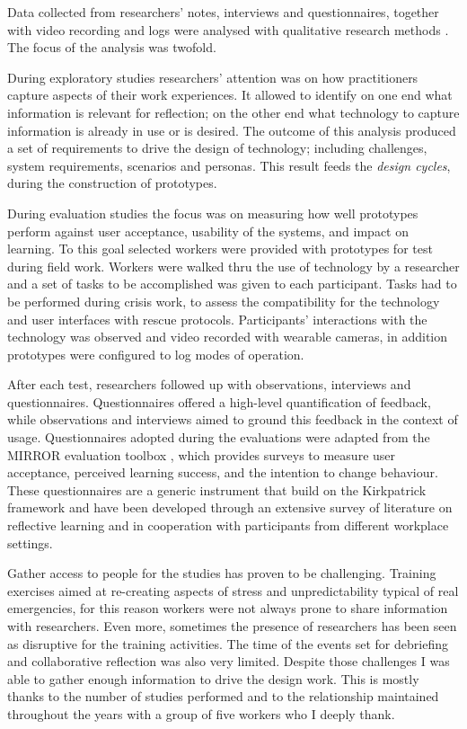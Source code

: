 Data collected from researchers' notes, interviews and questionnaires, together with video recording and logs were analysed with qualitative research methods \autocite{robson1993real}. The focus of the analysis was twofold.

During exploratory studies researchers' attention was on how practitioners capture aspects of their work experiences. It allowed to identify on one end what information is relevant for reflection; on the other end what technology to capture information is already in use or is desired. The outcome of this analysis produced a set of requirements to drive the design of technology; including challenges, system requirements, scenarios and personas. This result feeds the \emph{design cycles}, during the construction of prototypes.

During evaluation studies the focus was on measuring how well prototypes perform against user acceptance, usability of the systems, and impact on learning. To this goal selected workers were provided with prototypes for test during field work. Workers were walked thru the use of technology by a researcher and a set of tasks to be accomplished was given to each participant. Tasks had to be performed during crisis work, to assess the compatibility for the technology and user interfaces with rescue protocols. Participants' interactions with the technology was observed and video recorded with wearable cameras, in addition prototypes were configured to log modes of operation.

After each test, researchers followed up with observations, interviews and questionnaires. Questionnaires offered a high-level quantification of feedback, while observations and interviews aimed to ground this feedback in the context of usage. Questionnaires adopted during the evaluations were adapted from the MIRROR evaluation toolbox \autocite{Knipfer:2012vi}, which provides surveys to measure user acceptance, perceived learning success, and the intention to change behaviour. These questionnaires are a generic instrument that build on the Kirkpatrick framework \autocite{kirkpatrick2009evaluating}  and have been developed through an extensive survey of literature on reflective learning and in cooperation with participants from different workplace settings.

Gather access to people for the studies has proven to be challenging. Training exercises aimed at re-creating aspects of stress and unpredictability typical of real emergencies, for this reason workers were not always prone to share information with researchers. Even more, sometimes the presence of researchers has been seen as disruptive for the training activities. The time of the events set for debriefing and collaborative reflection was also very limited. Despite those challenges I was able to gather enough information to drive the design work. This is mostly thanks to the number of studies performed and to the relationship maintained throughout the years with a group of five workers who I deeply thank.

